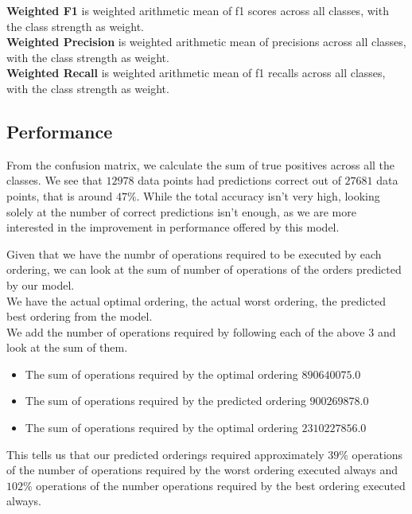 \par \textbf{Weighted F1} is weighted arithmetic mean of f1 scores across all classes, with the class strength as weight.\\
\textbf{Weighted Precision} is weighted arithmetic mean of precisions across all classes, with the class strength as weight.\\
\textbf{Weighted Recall} is weighted arithmetic mean of f1 recalls across all classes, with the class strength as weight.\\



\subsection{Performance}
From the confusion matrix, we calculate the sum of true positives across all the classes. We see that $12978$ data points had predictions correct out of $27681$ data points, that is around $47\%$. While the total accuracy isn't very high, looking solely at the number of correct predictions isn't enough, as we are more interested in the improvement in performance offered by this model.
\par Given that we have the numbr of operations required to be executed by each ordering, we can look at the sum of number of operations of the orders predicted by our model.\\ 
We have the actual optimal ordering, the actual worst ordering, the predicted best ordering from the model.\\
We add the number of operations required by following each of the above $3$ and look at the sum of them.\\
\begin{itemize}
    \item The sum of operations required by the optimal ordering $890640075.0$
    \item The sum of operations required by the predicted ordering $900269878.0$
    \item The sum of operations required by the optimal ordering $2310227856.0$
\end{itemize}
This tells us that our predicted orderings required approximately $39\%$ operations of the number of operations required by the worst ordering executed always and $102\%$ operations of the number operations required by the best ordering executed always.\\


